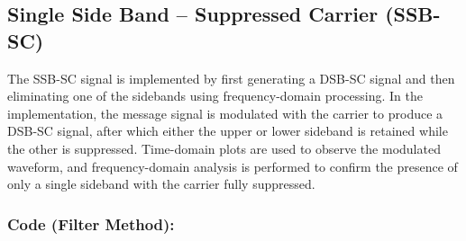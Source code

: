 \newpage
\subsection*{Single Side Band -- Suppressed Carrier (SSB-SC)}
The SSB-SC signal is implemented by first generating a DSB-SC signal and then eliminating
one of the sidebands using frequency-domain processing. In the implementation, the message
signal is modulated with the carrier to produce a DSB-SC signal, after which either the
upper or lower sideband is retained while the other is suppressed. Time-domain plots are
used to observe the modulated waveform, and frequency-domain analysis is performed to
confirm the presence of only a single sideband with the carrier fully suppressed.

\subsubsection*{Code (Filter Method):}

